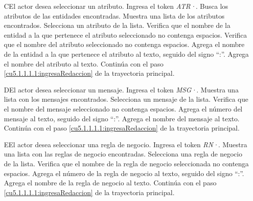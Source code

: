  \begin{UCtrayectoriaA}{C}{El actor desea seleccionar un atributo.}
 	\UCpaso[\UCactor] Ingresa el token {\it ATR·}.
  	\UCpaso[\UCsist] Busca los atributos de las entidades encontradas.
  	\UCpaso[\UCsist] Muestra una lista de los atributos encontrados.
 	\UCpaso[\UCactor] Selecciona un atributo de la lista.
  	\UCpaso[\UCsist] Verifica que el nombre de la entidad a la que pertenece el atributo seleccionado no contenga espacios. 
  	\UCpaso[\UCsist] Verifica que el nombre del atributo seleccionado no contenga espacios. 
  	\UCpaso[\UCsist] Agrega el nombre de la entidad a la que pertenece el atributo al texto, seguido del signo ``:''.
  	\UCpaso[\UCsist] Agrega el nombre del atributo al texto.
    \UCpaso[] Continúa con el paso \ref{cu5.1.1.1.1:ingresaRedaccion} de la trayectoria principal.
 \end{UCtrayectoriaA}
 \begin{UCtrayectoriaA}{D}{El actor desea seleccionar un mensaje.}
 	 \UCpaso[\UCactor] Ingresa el token {\it MSG·}.	
 	\UCpaso[\UCsist] Muestra una lista con los mensajes encontrados.
 	\UCpaso[\UCactor] Selecciona un mensaje de la lista.
  	\UCpaso[\UCsist] Verifica que el nombre del mensaje seleccionado no contenga espacios. 
  	\UCpaso[\UCsist] Agrega el número del mensaje al texto, seguido del signo ``:''.
  	\UCpaso[\UCsist] Agrega el nombre del mensaje al texto.
    \UCpaso[] Continúa con el paso \ref{cu5.1.1.1.1:ingresaRedaccion} de la trayectoria principal.
 \end{UCtrayectoriaA}
 \begin{UCtrayectoriaA}{E}{El actor desea seleccionar una regla de negocio.}
 	\UCpaso[\UCactor] Ingresa el token {\it RN·}.	
 	\UCpaso[\UCsist] Muestra una lista con las reglas de negocio encontradas.
 	\UCpaso[\UCactor] Selecciona una regla de negocio de la lista.
  	\UCpaso[\UCsist] Verifica que el nombre de la regla de negocio seleccionada no contenga espacios. 
  	\UCpaso[\UCsist] Agrega el número de la regla de negocio al texto, seguido del signo ``:''.
  	\UCpaso[\UCsist] Agrega el nombre de la regla de negocio al texto.
    \UCpaso[] Continúa con el paso \ref{cu5.1.1.1.1:ingresaRedaccion} de la trayectoria principal.
 \end{UCtrayectoriaA}
